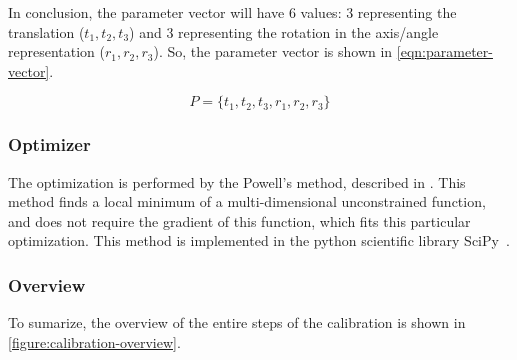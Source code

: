 In conclusion, the parameter vector will have 6 values: 3 representing the translation ($t_1, t_2, t_3$) and 3 representing the rotation in the axis/angle representation ($r_1, r_2, r_3$). So, the parameter vector is shown in \cref{eqn:parameter-vector}.

\begin{equation}
    \label{eqn:parameter-vector}
    P = \{t_1, t_2, t_3, r_1, r_2, r_3\}
\end{equation}

\subsubsection{Optimizer}

The optimization is performed by the Powell's method, described in \cite{powell_method}. This method finds a local minimum of a multi-dimensional unconstrained function, and does not require the gradient of this function, which fits this particular optimization. This method is implemented in the python scientific library SciPy~\cite{scipy-powell}.

\subsubsection{Overview}

To sumarize, the overview of the entire steps of the calibration is shown in \cref{figure:calibration-overview}.

